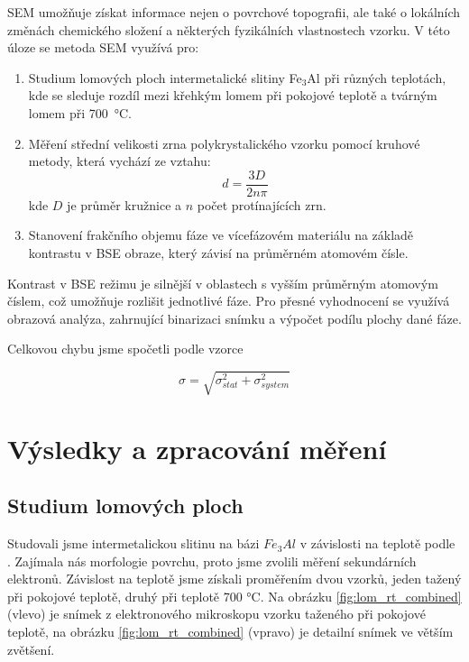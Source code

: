 SEM umožňuje získat informace nejen o povrchové topografii, ale také o lokálních změnách chemického složení a některých fyzikálních vlastnostech vzorku. V této úloze se metoda SEM využívá pro:
\begin{enumerate}
    \item Studium lomových ploch intermetalické slitiny Fe$_3$Al při různých teplotách, kde se sleduje rozdíl mezi křehkým lomem při pokojové teplotě a tvárným lomem při 700~°C.
    \item Měření střední velikosti zrna polykrystalického vzorku pomocí kruhové metody, která vychází ze vztahu:
\begin{equation}
    d = \frac{3D}{2n\pi}
\end{equation}
    kde $D$ je průměr kružnice a $n$ počet protínajících zrn.
    \item Stanovení frakčního objemu fáze ve vícefázovém materiálu na základě kontrastu v BSE obraze, který závisí na průměrném atomovém čísle.
\end{enumerate}

Kontrast v BSE režimu je silnější v oblastech s vyšším průměrným atomovým číslem, což umožňuje rozlišit jednotlivé fáze. Pro přesné vyhodnocení se využívá obrazová analýza, zahrnující binarizaci snímku a výpočet podílu plochy dané fáze.

Celkovou chybu jsme spočetli podle vzorce

\begin{equation}
    \sigma = \sqrt{\sigma^2_{stat}+\sigma^2_{system}}
\end{equation}
\newpage
\section{Výsledky a zpracování měření}

\subsection{Studium lomových ploch}

Studovali jsme intermetalickou slitinu na bázi $Fe_3Al$ v závislosti na teplotě podle \cite{bib:zadani}. Zajímala nás morfologie povrchu, proto jsme zvolili měření sekundárních elektronů. Závislost na teplotě jsme získali proměřením dvou vzorků, jeden tažený při pokojové teplotě, druhý při teplotě 700 °C. Na obrázku \ref{fig:lom_rt_combined} (vlevo) je snímek z elektronového mikroskopu vzorku taženého při pokojové teplotě, na obrázku \ref{fig:lom_rt_combined} (vpravo) je detailní snímek ve větším zvětšení. 

